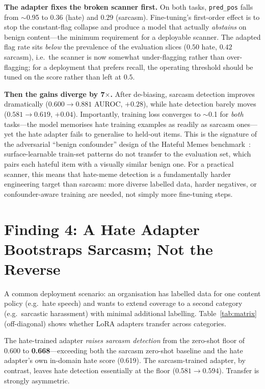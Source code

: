 \documentclass[sigconf,nonacm]{acmart}
\begin{document}
\noindent\textbf{The adapter fixes the broken scanner first.} On both tasks, \texttt{pred\_pos}
falls from $\sim$0.95 to $0.36$ (hate) and $0.29$ (sarcasm). Fine-tuning's first-order effect is
to stop the constant-flag collapse and produce a model that actually \emph{abstains} on benign
content---the minimum requirement for a deployable scanner. The adapted flag rate sits
\emph{below} the prevalence of the evaluation slices ($0.50$ hate, $0.42$ sarcasm), i.e.\ the
scanner is now somewhat under-flagging rather than over-flagging; for a deployment that
prefers recall, the operating threshold should be tuned on the score rather than left at $0.5$.

\noindent\textbf{Then the gains diverge by 7$\times$.} After de-biasing, sarcasm detection
improves dramatically ($0.600\to0.881$ AUROC, $+0.28$), while hate detection barely moves
($0.581\to0.619$, $+0.04$). Importantly, training loss converges to $\sim$0.1 for
\emph{both} tasks---the model memorises hate training examples as readily as sarcasm
ones---yet the hate adapter fails to generalise to held-out items. This is the signature of
the adversarial ``benign confounder'' design of the Hateful Memes
benchmark~\cite{kiela2020hateful}: surface-learnable train-set patterns do not transfer to
the evaluation set, which pairs each hateful item with a visually similar benign one. For
a practical scanner, this means that hate-meme detection is a fundamentally harder
engineering target than sarcasm: more diverse labelled data, harder negatives, or
confounder-aware training are needed, not simply more fine-tuning steps.

\section{Finding 4: A Hate Adapter Bootstraps Sarcasm; Not the Reverse}\label{sec:transfer}
A common deployment scenario: an organisation has labelled data for one content policy
(e.g.\ hate speech) and wants to extend coverage to a second category (e.g.\ sarcastic
harassment) with minimal additional labelling. Table~\ref{tab:matrix} (off-diagonal) shows
whether LoRA adapters transfer across categories.

The hate-trained adapter \emph{raises sarcasm detection} from the zero-shot floor of 0.600
to \textbf{0.668}---exceeding both the sarcasm zero-shot baseline and the hate adapter's
own in-domain hate score (0.619). The sarcasm-trained adapter, by contrast, leaves hate
detection essentially at the floor ($0.581\to0.594$). Transfer is strongly asymmetric.
\end{document}
